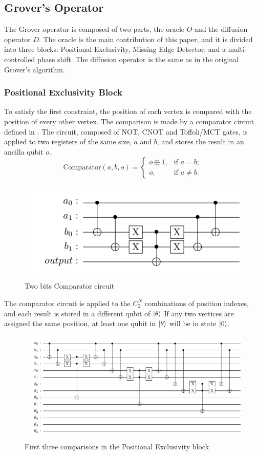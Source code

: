 \documentclass[10pt,a4paper]{article}
\begin{document}
\subsection{Grover's Operator}
The Grover operator is composed of two parts, the oracle $O$ and the diffusion operator $D$. The oracle is the main contribution of this paper, and it is divided into three blocks: Positional Exclusivity, Missing Edge Detector, and a multi-controlled phase shift. The diffusion operator is the same as in the original Grover's algorithm.
\subsubsection*{Positional Exclusivity Block}
To satisfy the first constraint, the position of each vertex is compared with the position of every other vertex. The comparison is made by a comparator circuit defined in \cite{Coloring1}. The circuit, composed of NOT, CNOT and Toffoli/MCT gates, is applied to two registers of the same size, $a$ and $b$, and  stores the result in an ancilla qubit $o$.
$$\text{Comparator}(a, b, o) =
\begin{cases}
o \oplus 1, & \text{if } a = b; \\
o, & \text{if } a \neq b.
\end{cases}$$
\begin{figure}[hbtp]
\centering
\includegraphics[scale=0.5]{figures/comparator.pdf}
\caption{Two bits Comparator circuit}
\end{figure}

The comparator circuit is applied to the $C^N_2$ combinations of position indexes, and each result is stored in a different qubit of $\ket{\theta}$ If any two vertices are assigned the same position, at least one qubit in $\ket{\theta}$ will be in state $\ket{0}$.

\begin{figure}[hbtp]
\centering
\includegraphics[scale=0.5]{figures/comparator_extended.pdf}
\caption{First three comparisons in the Positional Exclusivity block}
\end{figure}
\end{document}

